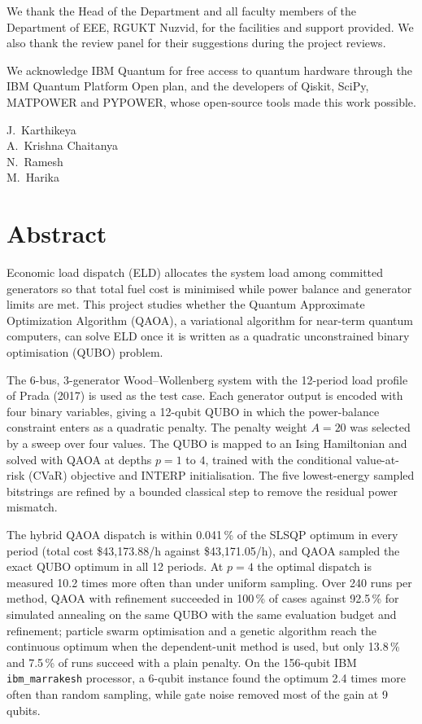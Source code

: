 We thank the Head of the Department and all faculty members of the Department of EEE, RGUKT Nuzvid, for the facilities and support provided. We also thank the review panel for their suggestions during the project reviews.

We acknowledge IBM Quantum for free access to quantum hardware through the IBM Quantum Platform Open plan, and the developers of Qiskit, SciPy, MATPOWER and PYPOWER, whose open-source tools made this work possible.

\vspace{1.5cm}
\noindent\hfill J.~Karthikeya\\
\hspace*{\fill} A.~Krishna Chaitanya\\
\hspace*{\fill} N.~Ramesh\\
\hspace*{\fill} M.~Harika

\chapter*{Abstract}
Economic load dispatch (ELD) allocates the system load among committed generators so that total fuel cost is minimised while power balance and generator limits are met. This project studies whether the Quantum Approximate Optimization Algorithm (QAOA), a variational algorithm for near-term quantum computers, can solve ELD once it is written as a quadratic unconstrained binary optimisation (QUBO) problem.

The 6-bus, 3-generator Wood--Wollenberg system with the 12-period load profile of Prada (2017) is used as the test case. Each generator output is encoded with four binary variables, giving a 12-qubit QUBO in which the power-balance constraint enters as a quadratic penalty. The penalty weight $A = 20$ was selected by a sweep over four values. The QUBO is mapped to an Ising Hamiltonian and solved with QAOA at depths $p = 1$ to $4$, trained with the conditional value-at-risk (CVaR) objective and INTERP initialisation. The five lowest-energy sampled bitstrings are refined by a bounded classical step to remove the residual power mismatch.

The hybrid QAOA dispatch is within 0.041\,\% of the SLSQP optimum in every period (total cost \$43{,}173.88/h against \$43{,}171.05/h), and QAOA sampled the exact QUBO optimum in all 12 periods. At $p = 4$ the optimal dispatch is measured 10.2 times more often than under uniform sampling. Over 240 runs per method, QAOA with refinement succeeded in 100\,\% of cases against 92.5\,\% for simulated annealing on the same QUBO with the same evaluation budget and refinement; particle swarm optimisation and a genetic algorithm reach the continuous optimum when the dependent-unit method is used, but only 13.8\,\% and 7.5\,\% of runs succeed with a plain penalty. On the 156-qubit IBM \texttt{ibm\_marrakesh} processor, a 6-qubit instance found the optimum 2.4 times more often than random sampling, while gate noise removed most of the gain at 9 qubits.

